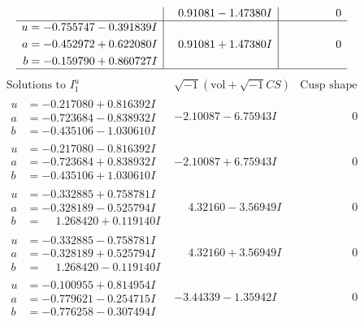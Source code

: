 \documentclass[1p]{elsarticle_modified}
\theoremstyle{definition}
\newcommand{\I}{\sqrt{-1}}
\begin{document}
$$\begin{array}{c|c|c}
 & \phantom{-}0.91081 - 1.47380 I & \phantom{-0.000000 } 0 \\ \hline\begin{aligned}
u &= -0.755747 - 0.391839 I \\
a &= -0.452972 + 0.622080 I \\
b &= -0.159790 + 0.860727 I\end{aligned}
 & \phantom{-}0.91081 + 1.47380 I & \phantom{-0.000000 } 0\\
 \hline 
 \end{array}$$\newpage$$\begin{array}{c|c|c}  
\text{Solutions to }I^u_{1}& \I (\text{vol} + \sqrt{-1}CS) & \text{Cusp shape}\\
 \hline 
\begin{aligned}
u &= -0.217080 + 0.816392 I \\
a &= -0.723684 - 0.838932 I \\
b &= -0.435106 - 1.030610 I\end{aligned}
 & -2.10087 - 6.75943 I & \phantom{-0.000000 } 0 \\ \hline\begin{aligned}
u &= -0.217080 - 0.816392 I \\
a &= -0.723684 + 0.838932 I \\
b &= -0.435106 + 1.030610 I\end{aligned}
 & -2.10087 + 6.75943 I & \phantom{-0.000000 } 0 \\ \hline\begin{aligned}
u &= -0.332885 + 0.758781 I \\
a &= -0.328189 - 0.525794 I \\
b &= \phantom{-}1.268420 + 0.119140 I\end{aligned}
 & \phantom{-}4.32160 - 3.56949 I & \phantom{-0.000000 } 0 \\ \hline\begin{aligned}
u &= -0.332885 - 0.758781 I \\
a &= -0.328189 + 0.525794 I \\
b &= \phantom{-}1.268420 - 0.119140 I\end{aligned}
 & \phantom{-}4.32160 + 3.56949 I & \phantom{-0.000000 } 0 \\ \hline\begin{aligned}
u &= -0.100955 + 0.814954 I \\
a &= -0.779621 - 0.254715 I \\
b &= -0.776258 - 0.307494 I\end{aligned}
 & -3.44339 - 1.35942 I & \phantom{-0.000000 } 0 \\ \hline\begin{aligned}

\end{aligned}
\end{array}$$
\end{document}

